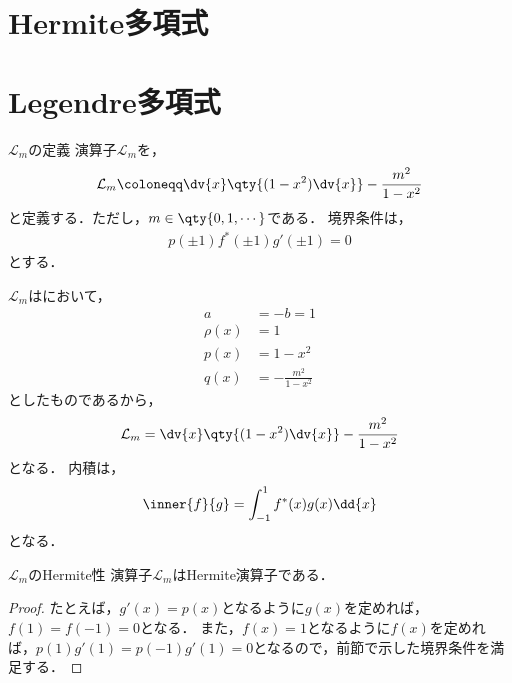\documentclass{report}
\begin{document}
    \section{Hermite多項式}
    \section{Legendre多項式}
      \begin{mydef}{$\mathcal{L}_m$の定義}{}
        演算子$\mathcal{L}_m$を，
        \begin{align}
          \mathcal{L}_m \coloneqq \dv{x}\qty{(1 - x^2)\dv{x}} - \frac{m^2}{1 - x^2}
        \end{align}
        と定義する．ただし，$m\in \qty{0, 1, \cdots}$である．
        境界条件は，
          \begin{align}
            p(\pm 1)f^*(\pm 1)g'(\pm 1) = 0
          \end{align}
          とする．
      \end{mydef}
      \begin{myrem}{}{}
        $\mathcal{L}_m$はにおいて，
        \begin{align}
          a &= -b = 1 \\ 
          \rho(x) &= 1 \\ 
          p(x) &= 1 - x^2 \\ 
          q(x) &= -\frac{m^2}{1 - x^2}
        \end{align}
        としたものであるから，
        \begin{align}
          \mathcal{L}_m = \dv{x}\qty{(1 - x^2)\dv{x}} - \frac{m^2}{1 - x^2}
        \end{align}
        となる．
        内積は，
        \begin{align}
          \inner{f}{g} = \int_{-1}^{1} f^*(x)g(x) \dd{x} \label{inner-prod-legendre}
        \end{align}
        となる．
      \end{myrem}
      \begin{myprop}{$\mathcal{L}_m$のHermite性}{}
        演算子$\mathcal{L}_m$はHermite演算子である．
        \tcblower
        \begin{proof}
          たとえば，$g'(x) = p(x)$となるように$g(x)$を定めれば，$f(1) = f(-1) = 0$となる．
          また，$f(x) = 1$となるように$f(x)$を定めれば，$p(1)g'(1) = p(-1)g'(1) = 0$となるので，前節で示した境界条件を満足する．
        \end{proof}
      \end{myprop}
\end{document}
